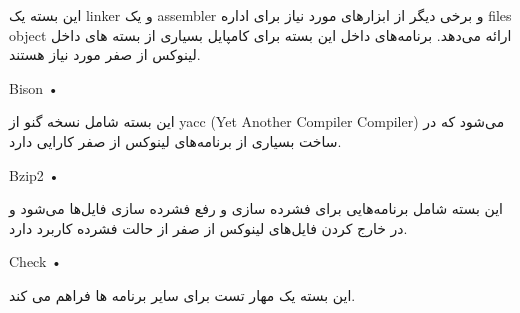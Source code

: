 \documentclass{book}
\begin{document}
این بسته یک linker و یک assembler و برخی دیگر از ابزارهای مورد نیاز برای اداره files object ارائه می‌دهد. برنامه‌های داخل این بسته برای کامپایل بسیاری از بسته های داخل لینوکس از صفر مورد نیاز هستند.

\begin{flushleft}


	Bison  •
	
\end{flushleft}

این بسته شامل نسخه گنو از yacc (Yet Another Compiler Compiler) می‌شود که در ساخت بسیاری از برنامه‌های لینوکس از صفر کارایی دارد.

\begin{flushleft}


	Bzip2  •
	
\end{flushleft}

این بسته شامل برنامه‌هایی برای فشرده سازی و رفع فشرده سازی فایل‌ها می‌شود و در خارج کردن فایل‌های لینوکس از صفر از حالت فشرده کاربرد دارد.

\begin{flushleft}


	Check  •
	
\end{flushleft}

این بسته یک مهار تست برای سایر برنامه ها فراهم می کند.
\end{document}
